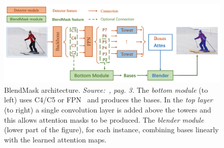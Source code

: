 \documentclass[10pt,twocolumn,letterpaper]{article}
\begin{document}
\begin{figure}[H]
\centering
  \includegraphics[width=1\linewidth]{./image/blendmask}
  \caption{BlendMask architecture. \textit{Source:~\cite{Authors2_BlendMask}, pag. 3.} The \textit{bottom module} (to left) uses C4/C5 or FPN~\cite{FPN} and produces the bases. In the \textit{top layer} (to right) a single convolution layer is added above the towers and this allows attention masks to be produced. The \textit{blender module} (lower part of the figure), for each instance, combining bases linearly with the learned attention maps.}
  \label{fig:blendmask}
\noindent
\end{figure}
\end{document}
